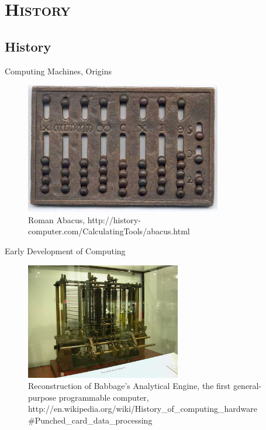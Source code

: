 \documentclass[xcolor=x11names,compress]{beamer}
\renewcommand{\(}{\begin{columns}}
\renewcommand{\)}{\end{columns}}
\newcommand{\<}[1]{\begin{column}{#1}}
\renewcommand{\>}{\end{column}}
\begin{document}
\section{\scshape History}
\subsection{History}
\begin{frame}{Computing Machines, Origins}
\begin{figure}
\includegraphics[height=2.25in,clip]{RomanAbacus}
\caption{Roman Abacus, http://history-computer.com/CalculatingTools/abacus.html}
\end{figure}

\end{frame}

\begin{frame}{Early Development of Computing}

\begin{figure}
\includegraphics[height=2in,clip]{BabbageDiffMachine}
\caption{Reconstruction of Babbage's Analytical Engine, the first general-purpose programmable computer, http://en.wikipedia.org/wiki/History\_of\_computing\_hardware
\#Punched\_card\_data\_processing}
\end{figure}

\end{frame}
\end{document}
